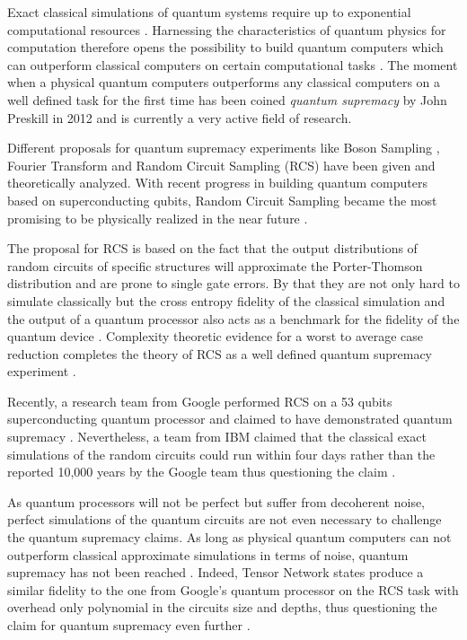 Exact classical simulations of quantum systems require up to exponential computational resources \cite{feynman1999simulating}.
Harnessing the characteristics of quantum physics for computation therefore opens the possibility to build quantum computers which can outperform classical computers on 
certain computational tasks \cite{shor1999polynomial}. The moment when a physical quantum computers outperforms any classical computers on a well defined task
for the first time has been coined \textit{quantum supremacy} by John
Preskill in 2012 and is currently a very active field of research.

Different proposals for quantum supremacy experiments like Boson Sampling \cite{aaronson2010computational}, Fourier Transform \cite{fefferman2015power} and Random Circuit Sampling (RCS) \cite{boixo2018characterizing} have
been given and theoretically analyzed. With recent progress in building quantum computers based on 
superconducting qubits, Random Circuit Sampling became the most promising to be physically realized in the near future \cite{boul2018quantum}.

The proposal for RCS is based on the fact that the output distributions of random circuits of specific structures will 
approximate the Porter-Thomson distribution and are prone to single gate errors. By that they are not only hard 
to simulate classically but the cross entropy fidelity of the classical simulation and the output of a 
quantum processor also acts as a benchmark for the fidelity of the quantum device \cite{boixo2018characterizing}. Complexity theoretic 
evidence for a worst to average case reduction completes the theory of 
RCS as a well defined quantum supremacy experiment \cite{boul2018quantum}.

Recently, a research team from Google performed RCS on a 53 qubits superconducting 
quantum processor and claimed to have demonstrated quantum supremacy \cite{google2019supremacy}. Nevertheless, a team from IBM 
claimed that the classical exact simulations of the random circuits could run within four days
rather than the reported 10,000 years by the Google team thus questioning the claim \cite{pednault2019leveraging}.

As quantum processors will not be perfect but suffer from decoherent noise, perfect simulations 
of the quantum circuits are not even necessary to challenge the quantum supremacy claims. 
As long as physical quantum computers can not outperform classical approximate simulations in 
terms of noise, quantum supremacy has not been reached \cite{boixo2018characterizing}.
Indeed, Tensor Network states produce a similar fidelity to the one from Google's quantum processor on the RCS task 
with overhead only polynomial in the circuits size and depths, thus questioning the claim for quantum supremacy even further \cite{fefferman2015power}.

